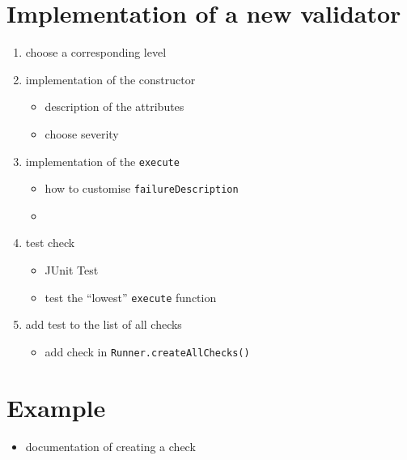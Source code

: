 \documentclass[12pt,a4paper]{article}
\newcommand{\function}[1]{\texttt{#1}}
\newcommand{\argument}[1]{\texttt{#1}}
\begin{document}
\section{Implementation of a new validator}
\begin{enumerate}
	\item choose a corresponding level 
	\item implementation of the constructor
	\begin{itemize}
		\item description of the attributes
		\item choose severity
	\end{itemize}
	\item implementation of the \function{execute} 
	\begin{itemize}
		\item how to customise \argument{failureDescription}
		\item 
	\end{itemize}
	\item test check
	\begin{itemize}
		\item JUnit Test
		\item test the \enquote{lowest} \function{execute} function
	\end{itemize}
	\item add test to the list of all checks
	\begin{itemize}
		\item add check in \function{Runner.createAllChecks()}
	\end{itemize}
\end{enumerate}
%
\section{Example}
\begin{itemize}
	\item documentation of creating a check
\end{itemize}
\end{document}
